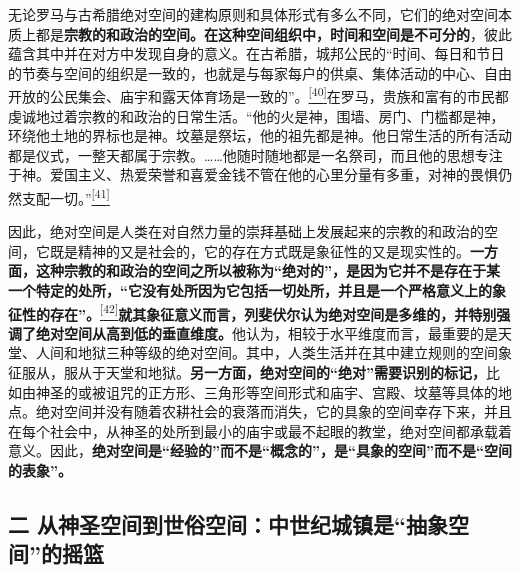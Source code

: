 \documentclass[UTF8, fontset = sourcesans, a4paper, oneside, zihao =
-4, scheme=chinese, no-math, space=true]{ctexbook}
\begin{document}
无论罗马与古希腊绝对空间的建构原则和具体形式有多么不同，它们的绝对空间本质上都是\textbf{宗教的和政治的空间。在这种空间组织中，时间和空间是不可分的}，彼此蕴含其中并在对方中发现自身的意义。在古希腊，城邦公民的``时间、每日和节日的节奏与空间的组织是一致的，也就是与每家每户的供桌、集体活动的中心、自由开放的公民集会、庙宇和露天体育场是一致的''。\protect\hypertarget{part0006_split_003.htmlux5cux23w40}{}{}\protect\hyperlink{part0006_split_003.htmlux5cux23m40}{\textsuperscript{{[}40{]}}}在罗马，贵族和富有的市民都虔诚地过着宗教的和政治的日常生活。``他的火是神，围墙、房门、门槛都是神，环绕他土地的界标也是神。坟墓是祭坛，他的祖先都是神。他日常生活的所有活动都是仪式，一整天都属于宗教。……他随时随地都是一名祭司，而且他的思想专注于神。爱国主义、热爱荣誉和喜爱金钱不管在他的心里分量有多重，对神的畏惧仍然支配一切。''\protect\hypertarget{part0006_split_003.htmlux5cux23w41}{}{}\protect\hyperlink{part0006_split_003.htmlux5cux23m41}{\textsuperscript{{[}41{]}}}

因此，绝对空间是人类在对自然力量的崇拜基础上发展起来的宗教的和政治的空间，它既是精神的又是社会的，它的存在方式既是象征性的又是现实性的。\textbf{一方面，这种宗教的和政治的空间之所以被称为``绝对的''，是因为它并不是存在于某一个特定的处所，``它没有处所因为它包括一切处所，并且是一个严格意义上的象征性的存在''。}\protect\hypertarget{part0006_split_003.htmlux5cux23w42}{}{}\protect\hyperlink{part0006_split_003.htmlux5cux23m42}{\textsuperscript{{[}42{]}}}\textbf{就其象征意义而言，列斐伏尔认为绝对空间是多维的，并特别强调了绝对空间从高到低的垂直维度。}他认为，相较于水平维度而言，最重要的是天堂、人间和地狱三种等级的绝对空间。其中，人类生活并在其中建立规则的空间象征服从，服从于天堂和地狱。\textbf{另一方面，绝对空间的``绝对''需要识别的标记，}比如由神圣的或被诅咒的正方形、三角形等空间形式和庙宇、宫殿、坟墓等具体的地点。绝对空间并没有随着农耕社会的衰落而消失，它的具象的空间幸存下来，并且在每个社会中，从神圣的处所到最小的庙宇或最不起眼的教堂，绝对空间都承载着意义。因此，\textbf{绝对空间是``经验的''而不是``概念的''，是``具象的空间''而不是``空间的表象''。}

\subsection{\texorpdfstring{二
从神圣空间到世俗空间：中世纪城镇是``抽象空间''的摇篮}{二 从神圣空间到世俗空间：中世纪城镇是抽象空间的摇篮}}\label{part0006_split_003.htmlux5cux23c022}
\end{document}
